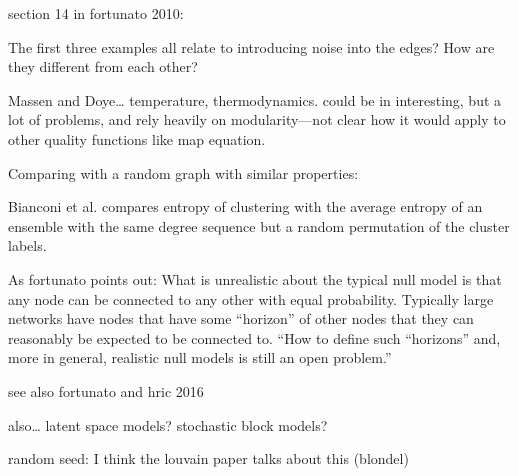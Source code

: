 section 14 in fortunato 2010:

The first three examples all relate to introducing noise into the edges?
How are they different from each other?

Massen and Doye\ldots{} temperature, thermodynamics. could be in
interesting, but a lot of problems, and rely heavily on modularity---not
clear how it would apply to other quality functions like map equation.

Comparing with a random graph with similar properties:

Bianconi et al. compares entropy of clustering with the average entropy
of an ensemble with the same degree sequence but a random permutation of
the cluster labels.

As fortunato points out: What is unrealistic about the typical null
model is that any node can be connected to any other with equal
probability. Typically large networks have nodes that have some
``horizon'' of other nodes that they can reasonably be expected to be
connected to. ``How to define such ``horizons'' and, more in general,
realistic null models is still an open problem.''

see also fortunato and hric 2016

also\ldots{} latent space models? stochastic block models?

random seed: I think the louvain paper talks about this (blondel)
